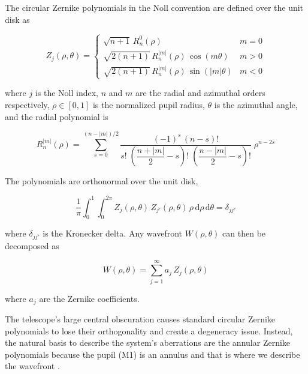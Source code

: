 \documentclass[SE,authoryear,toc]{lsstdoc}
\begin{document}
The circular Zernike polynomials in the Noll convention \cite{noll1976} are defined 
over the unit disk as

\begin{equation}
    Z_j(\rho, \theta) =
    \begin{cases}
        \sqrt{n+1}\, R_n^0(\rho) & m = 0 \\[6pt]
        \sqrt{2(n+1)}\, R_n^{|m|}(\rho)\,\cos(m\theta) & m > 0 \\[6pt]
        \sqrt{2(n+1)}\, R_n^{|m|}(\rho)\,\sin(|m|\theta) & m < 0
    \end{cases}
    \label{eq:zernike}
\end{equation}

\noindent where $j$ is the Noll index, $n$ and $m$ are the radial and 
azimuthal orders respectively, $\rho \in [0,1]$ is the normalized pupil 
radius, $\theta$ is the azimuthal angle, and the radial polynomial is

\begin{equation}
    R_n^{|m|}(\rho) = \sum_{s=0}^{(n-|m|)/2}
    \frac{(-1)^s\,(n-s)!}
    {s!\;\left(\dfrac{n+|m|}{2} - s\right)!\;\left(\dfrac{n-|m|}{2} - s\right)!}
    \;\rho^{n-2s}
    \label{eq:radial}
\end{equation}

\noindent The polynomials are orthonormal over the unit disk,

\begin{equation}
    \frac{1}{\pi}\int_0^1\int_0^{2\pi} 
    Z_j(\rho,\theta)\,Z_{j'}(\rho,\theta)\,\rho\,\mathrm{d}\rho\,\mathrm{d}\theta 
    = \delta_{jj'}
    \label{eq:orthonorm}
\end{equation}

\noindent where $\delta_{jj'}$ is the Kronecker delta. Any wavefront 
$W(\rho,\theta)$ can then be decomposed as

\begin{equation}
    W(\rho,\theta) = \sum_{j=1}^{\infty} a_j\, Z_j(\rho,\theta)
    \label{eq:expansion}
\end{equation}

\noindent where $a_j$ are the Zernike coefficients.

The telescope's large central obscuration causes standard circular Zernike polynomials to lose their orthogonality and create a degeneracy issue. Instead, the natural basis to describe the system's aberrations are the annular Zernike polynomials because the pupil (M1) is an annulus and that is where we describe the wavefront \citep{Xin2015}.
\end{document}
